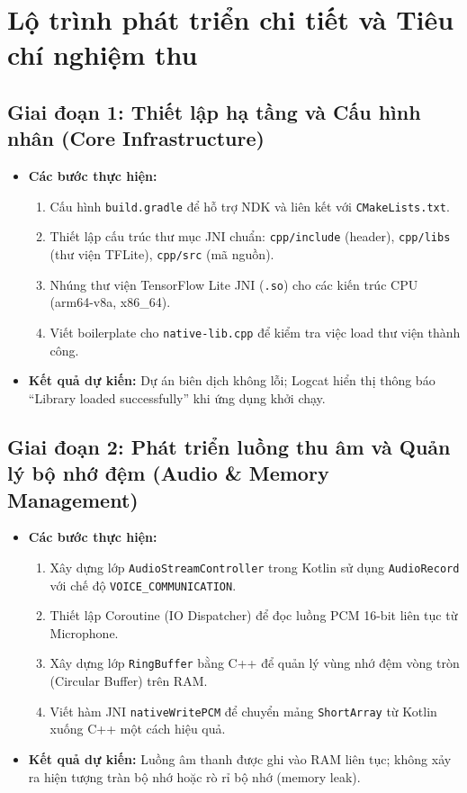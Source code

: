 \documentclass[12pt,a4paper]{article}
\begin{document}
\section{Lộ trình phát triển chi tiết và Tiêu chí nghiệm thu}

\subsection{Giai đoạn 1: Thiết lập hạ tầng và Cấu hình nhân (Core Infrastructure)}
\begin{itemize}
    \item \textbf{Các bước thực hiện:}
    \begin{enumerate}
        \item Cấu hình \texttt{build.gradle} để hỗ trợ NDK và liên kết với \texttt{CMakeLists.txt}.
        \item Thiết lập cấu trúc thư mục JNI chuẩn: \texttt{cpp/include} (header), \texttt{cpp/libs} (thư viện TFLite), \texttt{cpp/src} (mã nguồn).
        \item Nhúng thư viện TensorFlow Lite JNI (\texttt{.so}) cho các kiến trúc CPU (arm64-v8a, x86\_64).
        \item Viết boilerplate cho \texttt{native-lib.cpp} để kiểm tra việc load thư viện thành công.
    \end{enumerate}
    \item \textbf{Kết quả dự kiến:} Dự án biên dịch không lỗi; Logcat hiển thị thông báo ``Library loaded successfully'' khi ứng dụng khởi chạy.
\end{itemize}

\subsection{Giai đoạn 2: Phát triển luồng thu âm và Quản lý bộ nhớ đệm (Audio \& Memory Management)}
\begin{itemize}
    \item \textbf{Các bước thực hiện:}
    \begin{enumerate}
        \item Xây dựng lớp \texttt{AudioStreamController} trong Kotlin sử dụng \texttt{AudioRecord} với chế độ \texttt{VOICE\_COMMUNICATION}.
        \item Thiết lập Coroutine (IO Dispatcher) để đọc luồng PCM 16-bit liên tục từ Microphone.
        \item Xây dựng lớp \texttt{RingBuffer} bằng C++ để quản lý vùng nhớ đệm vòng tròn (Circular Buffer) trên RAM.
        \item Viết hàm JNI \texttt{nativeWritePCM} để chuyển mảng \texttt{ShortArray} từ Kotlin xuống C++ một cách hiệu quả.
    \end{enumerate}
    \item \textbf{Kết quả dự kiến:} Luồng âm thanh được ghi vào RAM liên tục; không xảy ra hiện tượng tràn bộ nhớ hoặc rò rỉ bộ nhớ (memory leak).
\end{itemize}
\end{document}
